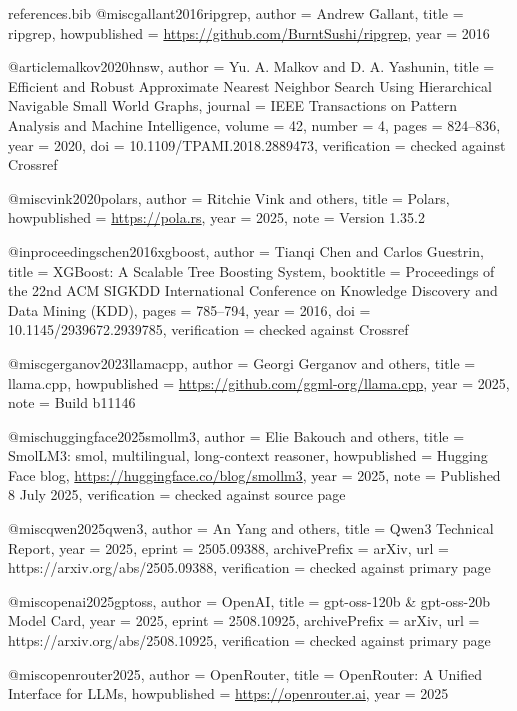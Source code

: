 \begin{filecontents*}[overwrite]{references.bib}
@misc{gallant2016ripgrep,
  author = {Andrew Gallant},
  title = {ripgrep},
  howpublished = {\url{https://github.com/BurntSushi/ripgrep}},
  year = {2016}
}

@article{malkov2020hnsw,
  author = {Yu. A. Malkov and D. A. Yashunin},
  title = {Efficient and Robust Approximate Nearest Neighbor Search Using Hierarchical Navigable Small World Graphs},
  journal = {IEEE Transactions on Pattern Analysis and Machine Intelligence},
  volume = {42},
  number = {4},
  pages = {824--836},
  year = {2020},
  doi = {10.1109/TPAMI.2018.2889473},
  verification = {checked against Crossref}
}

@misc{vink2020polars,
  author = {Ritchie Vink and others},
  title = {Polars},
  howpublished = {\url{https://pola.rs}},
  year = {2025},
  note = {Version 1.35.2}
}

@inproceedings{chen2016xgboost,
  author = {Tianqi Chen and Carlos Guestrin},
  title = {{XGBoost}: A Scalable Tree Boosting System},
  booktitle = {Proceedings of the 22nd ACM SIGKDD International Conference on Knowledge Discovery and Data Mining (KDD)},
  pages = {785--794},
  year = {2016},
  doi = {10.1145/2939672.2939785},
  verification = {checked against Crossref}
}

@misc{gerganov2023llamacpp,
  author = {Georgi Gerganov and others},
  title = {llama.cpp},
  howpublished = {\url{https://github.com/ggml-org/llama.cpp}},
  year = {2025},
  note = {Build b11146}
}

@misc{huggingface2025smollm3,
  author = {Elie Bakouch and others},
  title = {{SmolLM3}: smol, multilingual, long-context reasoner},
  howpublished = {Hugging Face blog, \url{https://huggingface.co/blog/smollm3}},
  year = {2025},
  note = {Published 8 July 2025},
  verification = {checked against source page}
}

@misc{qwen2025qwen3,
  author = {An Yang and others},
  title = {{Qwen3} Technical Report},
  year = {2025},
  eprint = {2505.09388},
  archivePrefix = {arXiv},
  url = {https://arxiv.org/abs/2505.09388},
  verification = {checked against primary page}
}

@misc{openai2025gptoss,
  author = {{OpenAI}},
  title = {gpt-oss-120b \& gpt-oss-20b Model Card},
  year = {2025},
  eprint = {2508.10925},
  archivePrefix = {arXiv},
  url = {https://arxiv.org/abs/2508.10925},
  verification = {checked against primary page}
}

@misc{openrouter2025,
  author = {{OpenRouter}},
  title = {{OpenRouter}: A Unified Interface for {LLMs}},
  howpublished = {\url{https://openrouter.ai}},
  year = {2025}
}


\end{filecontents*}
